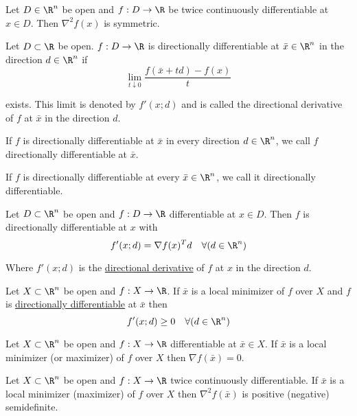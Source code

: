 \label{c3524e9}

Let $D\in\R^n$ be open and $f:D\to\R$ be twice continuously differentiable at
$x\in D$. Then $\nabla^2f(x)$ is symmetric.

\label{37eb747}

Let $D\subset \R$ be open. $f:D\to\R$ is directionally differentiable at $\bar
x\in\R^n$ in the direction $d\in\R^n$ if
$$
  \lim_{t\downarrow0}\frac{f(\bar x+td)-f(x)}t
$$

exists. This limit is denoted by $f'(x;d)$ and is called the directional
derivative of $f$ at $\bar x$ in the direction $d$.

If $f$ is directionally differentiable at $\bar x$ in every direction
$d\in\R^n$, we call $f$ directionally differentiable at $\bar x$.

If $f$ is directionally differentiable at every $\bar x\in\R^n$, we call it
directionally differentiable.

\label{ed67d29}

Let $D\subset \R^n$ be open and $f:D\to\R$ differentiable at $x\in D$. Then $f$
is directionally differentiable at $x$ with
$$
  f'(x;d)=\nabla f(x)^Td\quad\forall(d\in\R^n)
$$

Where $f'(x;d)$ is the \href{37eb747}{directional derivative} of $f$ at $x$ in
the direction $d$.

\label{b3b5e10}

Let $X\subset\R^n$ be open and $f:X\to\R$. If $\bar x$ is a local minimizer of
$f$ over $X$ and $f$ is \href{37eb747}{directionally differentiable} at $\bar
x$ then
$$
  f'(x;d)\geq 0\quad\forall(d\in\R^n)
$$

\label{dc165c9}

Let $X\subset\R^n$ be open and $f:X\to\R$ differentiable at $\bar x\in X$. If
$\bar x$ is a local minimizer (or maximizer) of $f$ over $X$ then $\nabla
f(\bar x)=0$.

\label{ce5370d}

Let $X\subset\R^n$ be open and $f:X\to\R$ twice continuously differentiable. If
$\bar x$ is a local minimizer (maximizer) of $f$ over $X$ then $\nabla^2f(\bar
x)$ is positive (negative) semidefinite.


